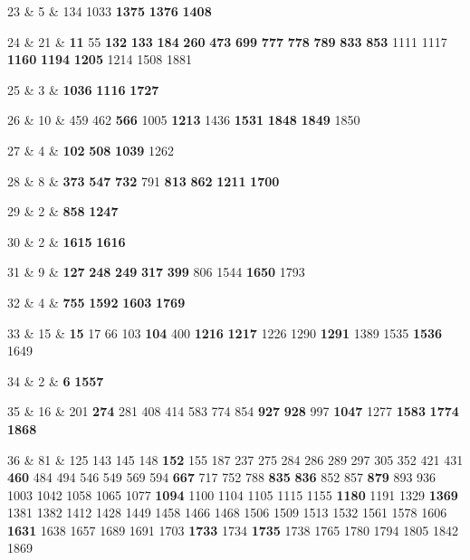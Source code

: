 23 & 5 & 134 1033 \textbf{1375} \textbf{1376} \textbf{1408} \\  

24 & 21 & \textbf{11} 55 \textbf{132} \textbf{133} \textbf{184} \textbf{260} \textbf{473} \textbf{699} \textbf{777} \textbf{778} \textbf{789} \textbf{833} \textbf{853} 1111 1117 \textbf{1160} \textbf{1194} \textbf{1205} 1214 1508 1881 \\  

25 & 3 & \textbf{1036} \textbf{1116} \textbf{1727} \\  

26 & 10 & 459 462 \textbf{566} 1005 \textbf{1213} 1436 \textbf{1531} \textbf{1848} \textbf{1849} 1850 \\  

27 & 4 & \textbf{102} \textbf{508} \textbf{1039} 1262 \\  

28 & 8 & \textbf{373} \textbf{547} \textbf{732} 791 \textbf{813} \textbf{862} \textbf{1211} \textbf{1700} \\  

29 & 2 & \textbf{858} \textbf{1247} \\  

30 & 2 & \textbf{1615} \textbf{1616} \\  

31 & 9 & \textbf{127} \textbf{248} \textbf{249} \textbf{317} \textbf{399} 806 1544 \textbf{1650} 1793 \\  

32 & 4 & \textbf{755} \textbf{1592} \textbf{1603} \textbf{1769} \\  

33 & 15 & \textbf{15} 17 66 103 \textbf{104} 400 \textbf{1216} \textbf{1217} 1226 1290 \textbf{1291} 1389 1535 \textbf{1536} 1649 \\  

34 & 2 & \textbf{6} \textbf{1557} \\  

35 & 16 & 201 \textbf{274} 281 408 414 583 774 854 \textbf{927} \textbf{928} 997 \textbf{1047} 1277 \textbf{1583} \textbf{1774} \textbf{1868} \\  

36 & 81 & 125 143 145 148 \textbf{152} 155 187 237 275 284 286 289 297 305 352 421 431 \textbf{460} 484 494 546 549 569 594 \textbf{667} 717 752 788 \textbf{835} \textbf{836} 852 857 \textbf{879} 893 936 1003 1042 1058 1065 1077 \textbf{1094} 1100 1104 1105 1115 1155 \textbf{1180} 1191 1329 \textbf{1369} 1381 1382 1412 1428 1449 1458 1466 1468 1506 1509 1513 1532 1561 1578 1606 \textbf{1631} 1638 1657 1689 1691 1703 \textbf{1733} 1734 \textbf{1735} 1738 1765 1780 1794 1805 1842 1869 \\  

